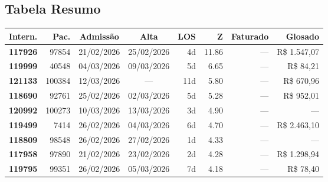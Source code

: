 \documentclass[a4paper,10pt]{article}
\begin{document}
\subsection{Tabela Resumo}
\begin{center}
\begin{longtable}{>{\scriptsize}r>{\scriptsize}r>{\scriptsize}c>{\scriptsize}c>{\scriptsize}r>{\scriptsize}r>{\scriptsize}r>{\scriptsize}r}
\toprule
\textbf{Intern.} & \textbf{Pac.} & \textbf{Admiss\~{a}o} & \textbf{Alta} & \textbf{LOS} & \textbf{Z} & \textbf{Faturado} & \textbf{Glosado} \\
\midrule
\endhead
\bottomrule
\endfoot

\textcolor{anomred}{\textbf{117926}} & 97854 & 21/02/2026 & 25/02/2026 & 4d & \textcolor{anomred}{11.86} & --- & \textcolor{anomred}{R\$ 1.547,07} \\

\textcolor{anomred}{\textbf{119999}} & 40548 & 04/03/2026 & 09/03/2026 & 5d & \textcolor{anomred}{6.65} & --- & \textcolor{anomred}{R\$ 84,21} \\

\textcolor{anomred}{\textbf{121133}} & 100384 & 12/03/2026 & — & 11d & \textcolor{anomred}{5.80} & --- & \textcolor{anomred}{R\$ 670,96} \\

\textcolor{anomred}{\textbf{118690}} & 92761 & 25/02/2026 & 02/03/2026 & 5d & \textcolor{anomred}{5.28} & --- & \textcolor{anomred}{R\$ 952,01} \\

\textcolor{anomorange}{\textbf{120992}} & 100273 & 10/03/2026 & 13/03/2026 & 3d & \textcolor{anomorange}{4.90} & --- & --- \\

\textcolor{anomorange}{\textbf{119499}} & 7414 & 26/02/2026 & 04/03/2026 & 6d & \textcolor{anomorange}{4.70} & --- & \textcolor{anomred}{R\$ 2.463,10} \\

\textcolor{anomorange}{\textbf{118809}} & 98548 & 26/02/2026 & 27/02/2026 & 1d & \textcolor{anomorange}{4.33} & --- & --- \\

\textcolor{anomorange}{\textbf{117958}} & 97890 & 21/02/2026 & 23/02/2026 & 2d & \textcolor{anomorange}{4.28} & --- & \textcolor{anomred}{R\$ 1.298,94} \\

\textcolor{anomorange}{\textbf{119795}} & 99351 & 26/02/2026 & 05/03/2026 & 7d & \textcolor{anomorange}{4.18} & --- & \textcolor{anomred}{R\$ 78,40} \\


\end{longtable}
\end{center}
\end{document}
